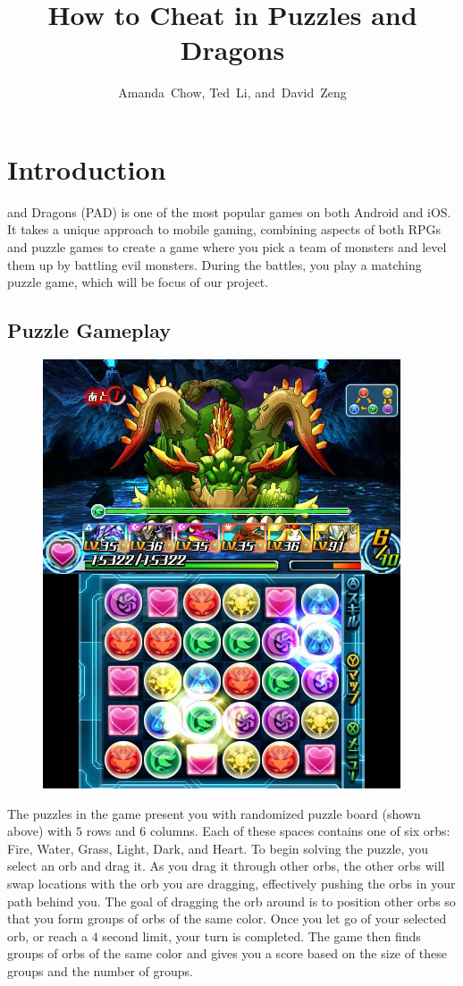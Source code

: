 \documentclass[journal,final,letterpaper,11pt]{IEEEtran}
\begin{document}
\title{How to Cheat in Puzzles and Dragons}
\author{Amanda~Chow, Ted~Li, and~David~Zeng}
\maketitle

\section{Introduction}
 and Dragons (PAD) is one of the most popular games on both  Android and iOS. It takes a unique approach to mobile gaming, combining aspects of both RPGs and puzzle games to create a game where you pick a team of monsters and level them up by battling evil monsters. During the battles, you play a matching puzzle game, which will be focus of our project.
\vspace*{-0.15in}
\subsection{Puzzle Gameplay}
\begin{figure}[h]
\vspace*{-0.1in}
\centering
\includegraphics[scale=0.5]{pad.jpg}
\end{figure}
\vspace*{-0.1in}
The puzzles in the game present you with randomized puzzle board (shown above) with $5$ rows and $6$ columns. Each of these spaces contains one of six orbs: Fire, Water, Grass, Light, Dark, and Heart. To begin solving the puzzle, you select an orb and drag it. As you drag it through other orbs, the other orbs will swap locations with the orb you are dragging, effectively pushing the orbs in your path behind you. The goal of dragging the orb around is to position other orbs so that you form groups of orbs of the same color. Once you let go of your selected orb, or reach a $4$ second limit, your turn is completed. The game then finds groups of orbs of the same color and gives you a score based on the size of these groups and the number of groups.
\end{document}
